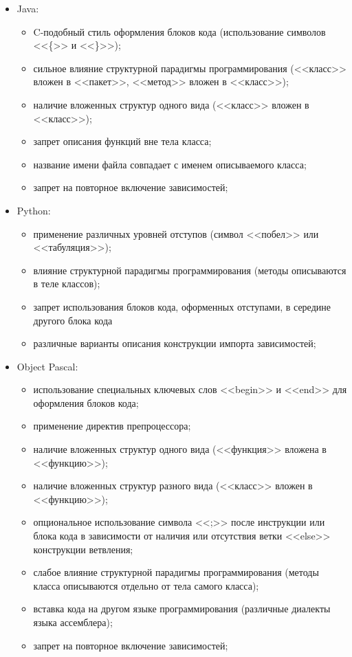 \begin{itemize}[noitemsep]
  \item Java:
    \begin{itemize}[noitemsep]
      \item C-подобный стиль оформления блоков кода (использование символов <<\{>> и <<\}>>);
      \item сильное влияние структурной парадигмы программирования (<<класс>> вложен в <<пакет>>, <<метод>> вложен в <<класс>>);
      \item наличие вложенных структур одного вида (<<класс>> вложен в <<класс>>);
      \item запрет описания функций вне тела класса;
      \item название имени файла совпадает с именем описываемого класса;
      \item запрет на повторное включение зависимостей;
    \end{itemize}

  \item Python:
    \begin{itemize}[noitemsep]
      \item применение различных уровней отступов (символ <<побел>> или <<табуляция>>);
      \item влияние структурной парадигмы программирования (методы описываются в теле классов);
      \item запрет использования блоков кода, оформенных отступами, в середине другого блока кода
      \item различные варианты описания конструкции импорта зависимостей;
    \end{itemize}

  \item Object Pascal:
    \begin{itemize}[noitemsep]
      \item использование специальных ключевых слов <<begin>> и <<end>> для оформления блоков кода;
      \item применение директив препроцессора;
      \item наличие вложенных структур одного вида (<<функция>> вложена в <<функцию>>);
      \item наличие вложенных структур разного вида (<<класс>> вложен в <<функцию>>);
      \item опциональное использование символа <<;>> после инструкции или блока кода в зависимости от наличия или отсутствия ветки <<else>> конструкции ветвления;
      \item слабое влияние структурной парадигмы программирования (методы класса описываются отдельно от тела самого класса);
      \item вставка кода на другом языке программирования (различные диалекты языка ассемблера);
      \item запрет на повторное включение зависимостей;
    \end{itemize}


\end{itemize}
